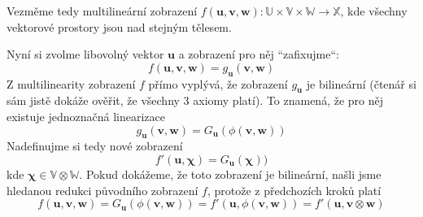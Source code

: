 \documentclass[a5paper,12pt]{amsbook}
\theoremstyle{definition}
\newcommand{\myvec}[1]{\mathbf{#1}}
\newcommand{\myspace}[1]{\mathbb{#1}}
\begin{document}
Vezměme tedy multilineární zobrazení $f(\myvec{u}, \myvec{v}, \myvec{w}):
\myspace{U}\times\myspace{V}\times\myspace{W}\rightarrow\myspace{X}$, kde všechny vektorové prostory
jsou nad stejným tělesem.

Nyní si zvolme libovolný vektor $\myvec{u}$ a zobrazení pro něj ``zafixujme``:
\begin{equation*}
f(\myvec{u}, \myvec{v}, \myvec{w}) = g_{\myvec{u}}(\myvec{v}, \myvec{w})
\end{equation*}
Z multilinearity zobrazení $f$ přímo vyplývá, že zobrazení $g_{\myvec{u}}$ je bilineární (čtenář
si sám jistě dokáže ověřit, že všechny 3 axiomy platí). To znamená, že pro něj existuje jednoznačná
linearizace
\begin{equation*}
g_{\myvec{u}}(\myvec{v}, \myvec{w}) = G_{\myvec{u}}(\phi(\myvec{v}, \myvec{w}))
\end{equation*}
Nadefinujme si tedy nové zobrazení
\begin{equation*}
f'(\myvec{u}, \myvec{\chi}) = G_{\myvec{u}}(\myvec{\chi}))
\end{equation*}
kde $\myvec{\chi}\in\myspace{V}\otimes\myspace{W}$. Pokud dokážeme, že toto zobrazení je bilineární,
našli jsme hledanou redukci původního zobrazení $f$, protože z předchozích kroků platí
\begin{equation*}
f(\myvec{u}, \myvec{v}, \myvec{w}) = G_{\myvec{u}}(\phi(\myvec{v}, \myvec{w})) 
  = f'(\myvec{u}, \phi(\myvec{v}, \myvec{w})) = f'(\myvec{u}, \myvec{v}\otimes\myvec{w})
\end{equation*}
\end{document}
